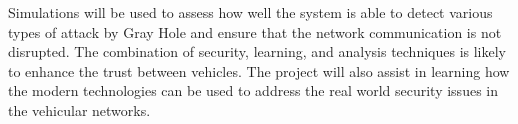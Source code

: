 \documentclass[12pt, a4paper]{report}
\newcommand{\mypar}{\vspace{0.8em}\noindent}
\begin{document}
\mypar
Simulations will be used to assess how well the system is able to detect various types of attack by Gray Hole and ensure that the network communication is not disrupted. The combination of security, learning, and analysis techniques is likely to enhance the trust between vehicles. The project will also assist in learning how the modern technologies can be used to address the real world security issues in the vehicular networks.


\renewcommand{\bibname}{References}

 
\end{document}
